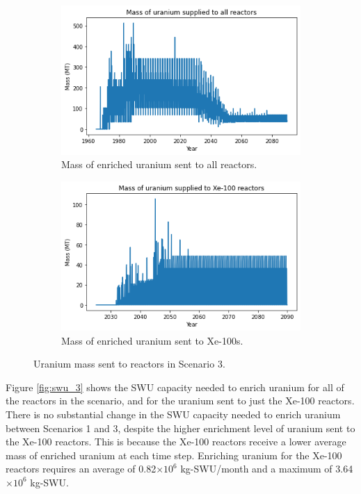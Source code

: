\begin{figure}
    \centering
    \begin{subfigure}{0.5\textwidth}
        \centering
        \includegraphics[scale=0.5]{../figures/fuelsupply_scenarios_3.png}
        \caption{Mass of enriched uranium sent to all reactors.}
        \label{fig:totalfuel_3}
    \end{subfigure}
    \hspace{0.8cm}
    \begin{subfigure}{0.5\textwidth}
        \centering
        \includegraphics[scale=0.5]{../figures/advancedRX_fuelsupply_scenarios_3.png}
        \caption{Mass of enriched uranium sent to Xe-100s.}
        \label{fig:haleu_3}
    \end{subfigure}
    \caption{Uranium mass sent to reactors in Scenario 3.}
    \label{fig:fuel_3}
\end{figure}

Figure \ref{fig:swu_3} shows the \gls{SWU} capacity needed to enrich 
uranium for all of the reactors in the scenario, and for the uranium sent 
to just the Xe-100 reactors. There is no substantial change in the 
\gls{SWU} capacity needed to enrich uranium between Scenarios 1 and 3, 
despite the higher enrichment level of uranium 
sent to the Xe-100 reactors. This is because the Xe-100 reactors receive 
a lower average mass of enriched uranium at each time step. Enriching uranium 
for the Xe-100 reactors requires an average of 
0.82$\times 10^6$ kg-\gls{SWU}/month and a maximum of 3.64$\times 10^6$
kg-\gls{SWU}.  

